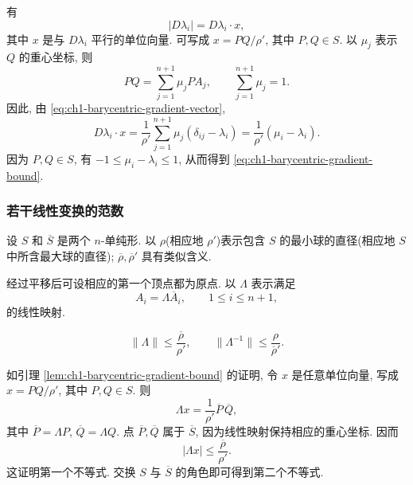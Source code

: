 \begin{Proof}
有
\begin{equation}
|D\lambda_i|=D\lambda_i\cdot x,
\label{eq:ch1-barycentric-gradient-direction}
\end{equation}
其中 $x$ 是与 $D\lambda_i$ 平行的单位向量. 可写成 $x=PQ/\rho'$, 其中 $P,Q\in S$. 以 $\mu_j$ 表示 $Q$ 的重心坐标, 则
\[
PQ=\sum_{j=1}^{n+1}\mu_jPA_j,\qquad
\sum_{j=1}^{n+1}\mu_j=1.
\]
因此, 由 \eqref{eq:ch1-barycentric-gradient-vector},
\[
D\lambda_i\cdot x
=\frac1{\rho'}\sum_{j=1}^{n+1}\mu_j(\delta_{ij}-\lambda_i)
=\frac1{\rho'}(\mu_i-\lambda_i).
\]
因为 $P,Q\in S$, 有 $-1\leq\mu_i-\lambda_i\leq1$, 从而得到 \eqref{eq:ch1-barycentric-gradient-bound}.
\end{Proof}

\subsubsection*{若干线性变换的范数}

设 $S$ 和 $\overline S$ 是两个 $n$-单纯形. 以 $\rho$(相应地 $\rho'$)表示包含 $S$ 的最小球的直径(相应地 $S$ 中所含最大球的直径); $\overline\rho,\overline\rho'$ 具有类似含义.

经过平移后可设相应的第一个顶点都为原点. 以 $\Lambda$ 表示满足
\begin{equation}
A_i=\Lambda\overline A_i,\qquad1\leq i\leq n+1,
\label{eq:ch1-simplex-linear-map}
\end{equation}
的线性映射.

\begin{Lemma}
\label{lem:ch1-simplex-linear-map-norms}
\begin{equation}
\|\Lambda\|\leq\frac{\overline\rho}{\rho'},
\qquad
\|\Lambda^{-1}\|\leq\frac{\rho}{\overline\rho'}.
\label{eq:ch1-simplex-linear-map-norms}
\end{equation}
\end{Lemma}

\begin{Proof}
如引理 \ref{lem:ch1-barycentric-gradient-bound} 的证明, 令 $x$ 是任意单位向量, 写成 $x=PQ/\rho'$, 其中 $P,Q\in S$. 则
\[
\Lambda x=\frac1{\rho'}\overline P\,\overline Q,
\]
其中 $\overline P=\Lambda P$, $\overline Q=\Lambda Q$. 点 $\overline P,\overline Q$ 属于 $\overline S$, 因为线性映射保持相应的重心坐标. 因而
\[
|\Lambda x|\leq\frac{\overline\rho}{\rho'}.
\]
这证明第一个不等式. 交换 $S$ 与 $\overline S$ 的角色即可得到第二个不等式.
\end{Proof}

